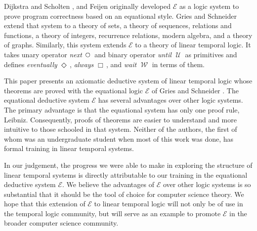 \documentclass[12pt, fleqn, leqno]{article}
\newcommand{\Until}{\;\mathcal{U}\;}
\newcommand{\Wait}{\;\mathcal{W}\;}
\newcommand{\Next}{\;\,\text{\raisebox{3.5pt}{\circle{6}}}}
\newcommand{\Event}{\Diamond\,}
\newcommand{\Always}{\Box\,}
\begin{document}
Dijkstra and Scholten \cite{DandS}, and Feijen \cite{Feij} originally developed $\mathcal{E}$ as a logic system to prove
program correctness based on an equational style.
Gries and Schneider extend that system to a theory of sets, a theory of sequences,
relations and functions, a theory of integers, recurrence relations, modern algebra, and a theory of graphs.
Similarly, this system extends $\mathcal{E}$ to a theory of linear temporal logic.
It takes unary operator \textit{next} $\Next$ and binary operator \textit{until} $\Until$ as primitives and defines
\textit{eventually} $\Event$, \textit{always} $\Always$, and \textit{wait} $\Wait$ in terms of them.

This paper presents an axiomatic deductive system of linear temporal logic whose theorems are proved with the equational
logic $\mathcal{E}$ of Gries and Schneider \cite{LADM}.
The equational deductive system $\mathcal{E}$ has several advantages over other logic systems.
The primary advantage is that the equational system has only one proof rule, Leibniz.
Consequently, proofs of theorems are easier to understand and more intuitive to those schooled in that system.
Neither of the authors, the first of whom was an undergraduate student when most of this work was done,
has formal training in linear temporal systems.

In our judgement, the progress we were able to make in exploring the structure of linear temporal systems
is directly attributable to our training in the equational deductive system $\mathcal{E}$.
We believe the advantages of $\mathcal{E}$ over other logic systems is so substantial that it should be the
tool of choice for computer science theory.
We hope that this extension of $\mathcal{E}$ to linear temporal logic will not only be of use in the
temporal logic community, but will serve as an example to promote $\mathcal{E}$ in the broader computer science community.



\end{document}
